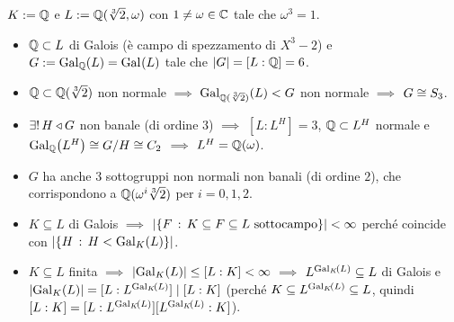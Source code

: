 \begin{esem}
$K:=\Q$ e $L:=\Q(\sqrt[3]{2},\omega)$ con $1\ne\omega\in\C$ tale che $\omega^3=1$.
\begin{itemize}
\item $\Q\subset L$ di Galois (è campo di spezzamento di $X^3-2$) e $G:=\Gal[\Q]{L}=\Gal{L}$ tale che $\card{G}=[L:\Q]=6$.
\item $\Q\subset\Q(\sqrt[3]{2})$ non normale $\implies$ $\Gal[{\Q(\sqrt[3]{2})}]{L}<G$ non normale $\implies$ $G\iso S_3$.
\item $\exiun H\normal G$ non banale (di ordine $3$) $\implies$ $[L:L^H]=3$, $\Q\subset L^H$ normale e $\Gal[\Q]{L^H}\iso G/H\iso C_2$ $\implies$ $L^H=\Q(\omega)$.
\item $G$ ha anche $3$ sottogruppi non normali non banali (di ordine $2$), che corrispondono a $\Q(\omega^i\sqrt[3]{2})$ per $i=0,1,2$.
\end{itemize}
\end{esem}

\begin{osse}
\begin{itemize}
\item $K\subseteq L$ di Galois $\implies$ $\card{\{F\st K\subseteq F\subseteq L\text{ sottocampo}\}}<\infty$ perché coincide con $\card{\{H\st H<\Gal[K]{L}\}}$.
\item $K\subseteq L$ finita $\implies$ $\card{\Gal[K]{L}}\le[L:K]<\infty$ $\implies$ $L^{\Gal[K]{L}}\subseteq L$ di Galois e $\card{\Gal[K]{L}}=[L:L^{\Gal[K]{L}}]\dvd [L:K]$ (perché $K\subseteq L^{\Gal[K]{L}}\subseteq L$, quindi $[L:K]=[L:L^{\Gal[K]{L}}][L^{\Gal[K]{L}}:K]$).
\end{itemize}
\end{osse}



